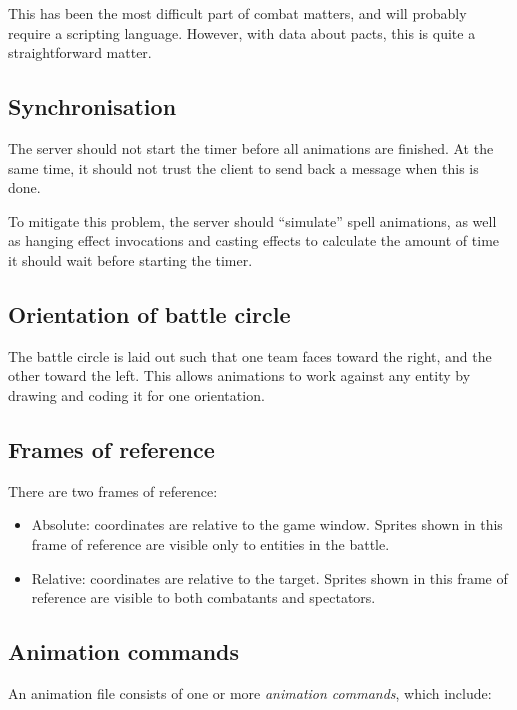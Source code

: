 \documentclass{article}
\begin{document}
This has been the most difficult part of combat matters, and will probably require a scripting language. However, with data about pacts, this is quite a straightforward matter.

\subsection{Synchronisation}

The server should not start the timer before all animations are finished. At the same time, it should not trust the client to send back a message when this is done.

To mitigate this problem, the server should ``simulate'' spell animations, as well as hanging effect invocations and casting effects to calculate the amount of time it should wait before starting the timer.

\subsection{Orientation of battle circle}

The battle circle is laid out such that one team faces toward the right, and the other toward the left. This allows animations to work against any entity by drawing and coding it for one orientation.

\subsection{Frames of reference}

There are two frames of reference:

\begin{itemize}
  \item Absolute: coordinates are relative to the game window. Sprites shown in this frame of reference are visible only to entities in the battle.
  \item Relative: coordinates are relative to the target. Sprites shown in this frame of reference are visible to both combatants and spectators.
\end{itemize}

\subsection{Animation commands}

An animation file consists of one or more \emph{animation commands}, which include:
\end{document}
